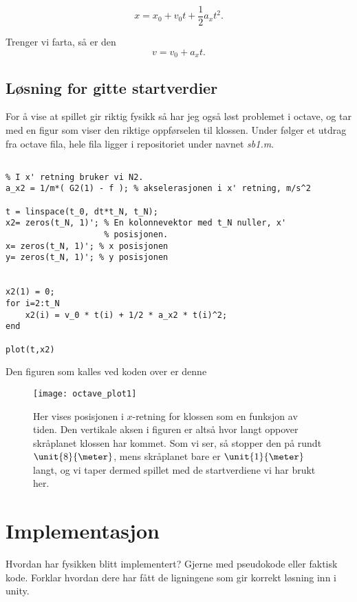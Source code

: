 \documentclass[letterpaper,12pt]{article}
\begin{document}
\begin{equation}
x = x_0 + v_0 t + \frac{1}{2}a_x t^2.
\end{equation}

Trenger vi farta, så er den 
\begin{equation}
v=v_0 +a_x t.
\end{equation}


\subsection{Løsning for gitte startverdier}
For å vise at spillet gir riktig fysikk så har jeg også løst problemet i octave, og tar med en figur som viser den riktige oppførselen til klossen.
Under følger et utdrag fra octave fila, hele fila ligger i repositoriet under navnet \emph{sb1.m}.

\begin{lstlisting}

% I x' retning bruker vi N2.
a_x2 = 1/m*( G2(1) - f ); % akselerasjonen i x' retning, m/s^2

t = linspace(t_0, dt*t_N, t_N);
x2= zeros(t_N, 1)'; % En kolonnevektor med t_N nuller, x'
                    % posisjonen.
x= zeros(t_N, 1)'; % x posisjonen
y= zeros(t_N, 1)'; % y posisjonen


x2(1) = 0;
for i=2:t_N
    x2(i) = v_0 * t(i) + 1/2 * a_x2 * t(i)^2;
end

plot(t,x2)
\end{lstlisting}


Den figuren som kalles ved koden over er denne
\begin{figure}[ht!] 
  \label{fig:kloss}
  \begin{center}
    \begin{turn}{0} %
        \texttt{[image: octave\_plot1]} %
    \end{turn}
  \end{center}
  \caption{Her vises posisjonen i $x$-retning for klossen som en funksjon av tiden. Den vertikale aksen i figuren er altså hvor langt oppover skråplanet klossen har kommet. Som vi ser, så stopper den på rundt $\unit{8}{\meter}$, mens skråplanet bare er $\unit{1}{\meter}$ langt, og vi taper dermed spillet med de startverdiene vi har brukt her. }
\end{figure}



\section{Implementasjon}
Hvordan har fysikken blitt implementert? Gjerne med pseudokode eller faktisk kode. Forklar hvordan dere har fått de ligningene som gir korrekt løsning inn i unity.




\end{document}
